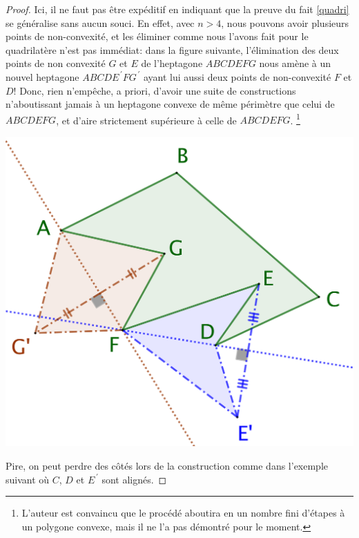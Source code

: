 \begin{proof}
	Ici, il ne faut pas être expéditif en indiquant que la preuve du fait \ref{quadri} se généralise sans aucun souci.
	En effet, avec $n > 4$, nous pouvons avoir plusieurs points de non-convexité, et les éliminer comme nous l'avons fait pour le quadrilatère n'est pas immédiat:
	dans la figure suivante, l'élimination des deux points de non convexité $G$ et $E$ de l'heptagone $ABCDEFG$ nous amène à un nouvel heptagone $ABCDE^{\,\prime}FG^{\,\prime}$ ayant lui aussi deux points de non-convexité $F$ et $D$!
	Donc, rien n'empêche, a priori, d'avoir une suite de constructions n'aboutissant jamais à un heptagone convexe
	de même périmètre que celui de $ABCDEFG$, et d'aire strictement supérieure à celle de $ABCDEFG$.%
	\footnote{
		L'auteur est convaincu que le procédé aboutira en un nombre fini d'étapes à un polygone convexe, mais il ne l'a pas démontré pour le moment.
	}

	\begin{center}
		\includegraphics[scale=.4]{content/polygon/polygon-non-convex-trap.png}
	\end{center}
	

	Pire, on peut perdre des côtés lors de la construction comme dans l'exemple suivant où $C$, $D$ et $E^{\,\prime}$ sont alignés.


\end{proof}
